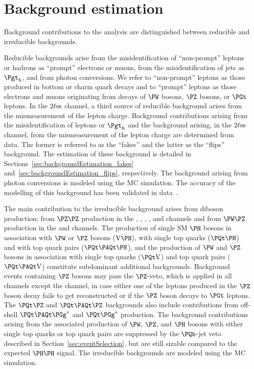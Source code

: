 \section{Background estimation}
\label{sec:backgroundEstimation}

Background contributions to the analysis are distinguished between reducible and irreducible backgrounds.

Reducible backgrounds arise from the misidentification of ``non-prompt'' leptons or hadrons as ``prompt'' electrons or muons,
from the misidentification of jets as $\tauh$, and from photon conversions.
We refer to ``non-prompt'' leptons as those produced in bottom or charm quark decays 
and to ``prompt'' leptons as those electrons and muons originating from decays of $\PW$ bosons, $\PZ$ bosons, or $\PGt$ leptons.
In the $2\ell\text{ss}$ channel, a third source of reducible background arises from the mismeasurement of the lepton charge.
Background contributions arising from the misidentification of leptons or $\tauh$ and the background arising, in the $2\ell\text{ss}$ channel, 
from the mismeasurement of the lepton charge are determined from data.
The former is referred to as the ``fakes'' and the latter as the ``flips'' background.
The estimation of these background is detailed in Sections~\ref{sec:backgroundEstimation_fakes} and~\ref{sec:backgroundEstimation_flips}, respectively.
The background arising from photon conversions is modeled using the MC simulation.
The accuracy of the modelling of this background has been validated in data~\cite{Sirunyan:2020icl}.

The main contribution to the irreducible background arises from diboson production;
from $\PZ\PZ$ production in the \zeroLeptonFourTau, \oneLeptonThreeTau, \twoLeptonTwoTau, \threeLeptonOneTau, and \fourLeptonZeroTau channels
and from $\PW\PZ$ production in the \twoLeptonssZeroTau and \threeLeptonZeroTau channels.
The production of single SM $\PHiggs$ bosons in association with $\PW$ or $\PZ$ bosons ($\V\PHiggs$), with single top quarks ($\tH$) and with top quark pairs ($\ttH$),
and the production of $\PW$ and $\PZ$ bosons in association with single top quarks ($\tV$) and top quark pairs ($\ttV$) constitute subdominant additional backgrounds.
Background events containing $\PZ$ bosons may pass the $\PZ$-veto, which is applied in all channels except the \zeroLeptonFourTau channel,
in case either one of the leptons produced in the $\PZ$ boson decay fails to get reconstructed or if the $\PZ$ boson decays to $\PGt$ leptons.
The $\tZ$ and $\ttZ$ backgrounds also include contributions from off-shell $\Ptop\APtop\Pggx$ and $\Ptop\Pggx$ production.
The background contributions arising from the associated production of $\PW$, $\PZ$, and $\PHiggs$ bosons with either single top quarks or top quark pairs
are suppressed by the $\Pbottom$-jet veto described in Section~\ref{sec:eventSelection}, but are still sizable compared to the expected $\PHiggs\PHiggs$ signal.
The irreducible backgrounds are modeled using the MC simulation.

